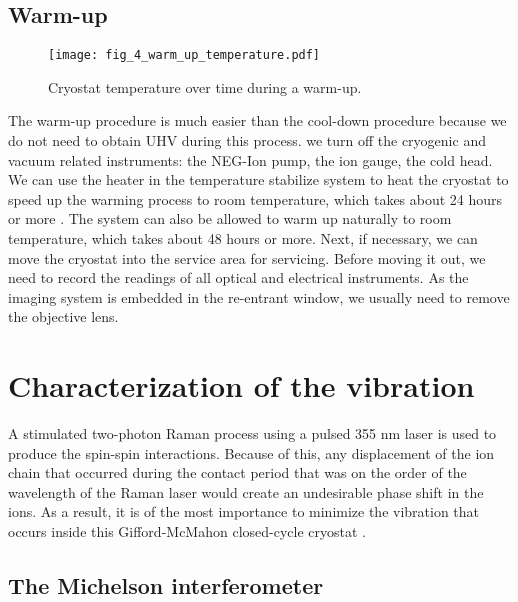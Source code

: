 \subsection{Warm-up}

\begin{figure}
    \centering
    \texttt{[image: fig\_4\_warm\_up\_temperature.pdf]}
    \caption{Cryostat temperature over time during a warm-up.}
\end{figure}

The warm-up procedure is much easier than the cool-down procedure because we do not need to obtain UHV during this process. we turn off the cryogenic and vacuum related instruments: the NEG-Ion pump, the ion gauge, the cold head. We can use the heater in the temperature stabilize system to heat the cryostat to speed up the warming process to room temperature, which takes about 24 hours or more \cite{RN357}. The system can also be allowed to warm up naturally to room temperature, which takes about 48 hours or more. Next, if necessary, we can move the cryostat into the service area for servicing. Before moving it out, we need to record the readings of all optical and electrical instruments. As the imaging system is embedded in the re-entrant window, we usually need to remove the objective lens.

\section{Characterization of the vibration}

A stimulated two-photon Raman process using a pulsed 355 nm laser is used to produce the spin-spin interactions. Because of this, any displacement of the ion chain that occurred during the contact period that was on the order of the wavelength of the Raman laser would create an undesirable phase shift in the ions. As a result, it is of the most importance to minimize the vibration that occurs inside this Gifford-McMahon closed-cycle cryostat \cite{RN126}.

\subsection{The Michelson interferometer}


